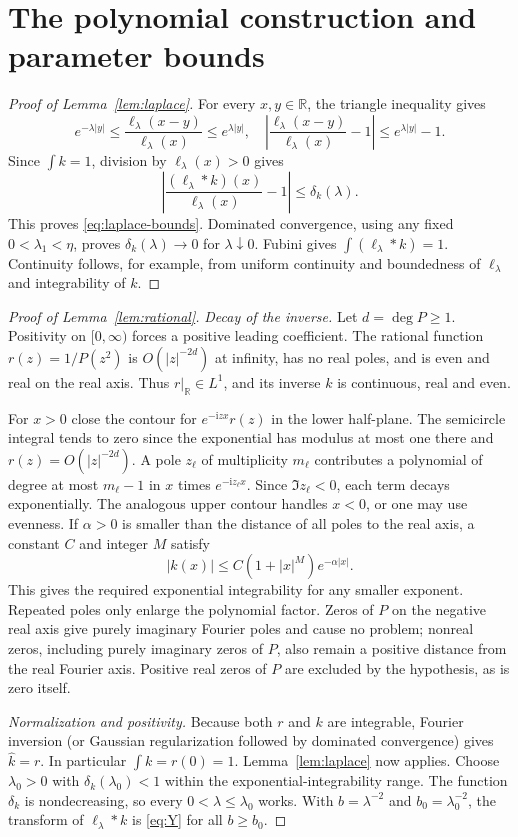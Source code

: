 \documentclass[11pt,twoside]{article}
\theoremstyle{journalplain}
\numberwithin{equation}{section}
\theoremstyle{journaldefinition}
\newcommand{\R}{\mathbb R}
\newcommand{\ii}{\mathrm i}
\begin{document}
\section{The polynomial construction and parameter bounds}\label{app:poly}
\begin{proof}[Proof of Lemma~\ref{lem:laplace}]
For every $x,y\in\R$, the triangle inequality gives
\[
 e^{-\lambda|y|}\le\frac{\ell_\lambda(x-y)}{\ell_\lambda(x)}\le e^{\lambda|y|},
 \quad
 \left|\frac{\ell_\lambda(x-y)}{\ell_\lambda(x)}-1\right|
 \le e^{\lambda|y|}-1.
\]
Since $\int k=1$, division by $\ell_\lambda(x)>0$ gives
\[
 \left|\frac{(\ell_\lambda*k)(x)}{\ell_\lambda(x)}-1\right|
 \le\delta_k(\lambda).
\]
This proves \eqref{eq:laplace-bounds}. Dominated convergence, using any fixed $0<\lambda_1<\eta$, proves $\delta_k(\lambda)\to0$ for $\lambda\downarrow0$. Fubini gives $\int(\ell_\lambda*k)=1$. Continuity follows, for example, from uniform continuity and boundedness of $\ell_\lambda$ and integrability of $k$.
\end{proof}

\begin{proof}[Proof of Lemma~\ref{lem:rational}]
\emph{Decay of the inverse.} Let $d=\deg P\ge1$. Positivity on $[0,\infty)$ forces a positive leading coefficient. The rational function $r(z)=1/P(z^2)$ is $O(|z|^{-2d})$ at infinity, has no real poles, and is even and real on the real axis. Thus $r|_\R\in L^1$, and its inverse $k$ is continuous, real and even.

For $x>0$ close the contour for $e^{-\ii zx}r(z)$ in the lower half-plane. The semicircle integral tends to zero since the exponential has modulus at most one there and $r(z)=O(|z|^{-2d})$. A pole $z_\ell$ of multiplicity $m_\ell$ contributes a polynomial of degree at most $m_\ell-1$ in $x$ times $e^{-\ii z_\ell x}$. Since $\Im z_\ell<0$, each term decays exponentially. The analogous upper contour handles $x<0$, or one may use evenness. If $\alpha>0$ is smaller than the distance of all poles to the real axis, a constant $C$ and integer $M$ satisfy
\[
 |k(x)|\le C(1+|x|^M)e^{-\alpha|x|}.
\]
This gives the required exponential integrability for any smaller exponent. Repeated poles only enlarge the polynomial factor. Zeros of $P$ on the negative real axis give purely imaginary Fourier poles and cause no problem; nonreal zeros, including purely imaginary zeros of $P$, also remain a positive distance from the real Fourier axis. Positive real zeros of $P$ are excluded by the hypothesis, as is zero itself.

\emph{Normalization and positivity.} Because both $r$ and $k$ are integrable, Fourier inversion (or Gaussian regularization followed by dominated convergence) gives $\widehat k=r$. In particular $\int k=r(0)=1$. Lemma~\ref{lem:laplace} now applies. Choose $\lambda_0>0$ with $\delta_k(\lambda_0)<1$ within the exponential-integrability range. The function $\delta_k$ is nondecreasing, so every $0<\lambda\le\lambda_0$ works. With $b=\lambda^{-2}$ and $b_0=\lambda_0^{-2}$, the transform of $\ell_\lambda*k$ is \eqref{eq:Y} for all $b\ge b_0$.
\end{proof}
\end{document}
